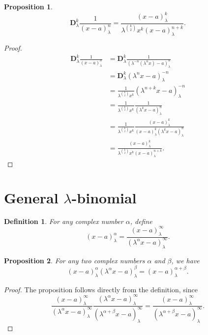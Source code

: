 \documentclass[12pt]{article}
\newcommand{\D}{\mathbf{D}}
\newtheorem{definition}{Definition}
\newtheorem{proposition}{Proposition}
\begin{document}
\begin{proposition}
    \begin{equation}
        \D_{\lambda}^k\frac{1}{(x-a)_{\lambda}^n}=\frac{(x-a)_{\lambda}^k}{\lambda^{\binom{k}{2}}x^k(x-a)_{\lambda}^{n+k}}.
    \end{equation}
\end{proposition}
\begin{proof}
    \begin{align*}
        \D_{\lambda}^k\frac{1}{(x-a)_{\lambda}^n}&=\D_{\lambda}^k\frac{1}{(\lambda^{-n}(\lambda^nx)-a)_{\lambda}^n}\\
        &=\D_{\lambda}^{k}(\lambda^nx-a)_{\lambda}^{-n}\\
        &=\frac{1}{\lambda^{\binom{k}{2}}x^k}(\lambda^{n+k}x-a)_{\lambda}^{-n}\\
        &=\frac{1}{\lambda^{\binom{k}{2}}x^k}\frac{1}{(\lambda^{k}x-a)_{\lambda}^n}\\
        &=\frac{1}{\lambda^{\binom{k}{2}}x^k}\frac{(x-a)_{\lambda}^k}{(x-a)_{\lambda}^k(\lambda^{k}x-a)_{\lambda}^n}\\
        &=\frac{(x-a)_{\lambda}^k}{\lambda^{\binom{k}{2}}x^k(x-a)_{\lambda}^{n+k}}.
    \end{align*}
\end{proof}

\section{General $\lambda$-binomial}\label{sec6}

\begin{definition}
For any complex number $\alpha$, define     
\begin{equation}
    (x-a)_{\lambda}^\alpha=\frac{(x-a)_{\lambda}^{\infty}}{(\lambda^{\alpha}x-a)_{\lambda}^\infty}.
\end{equation}
\end{definition}

\begin{proposition}
For any two complex numbers $\alpha$ and $\beta$, we have
    \begin{equation}
        (x-a)_{\lambda}^{\alpha}(\lambda^{\alpha}x-a)_{\lambda}^{\beta}=(x-a)_{\lambda}^{\alpha+\beta}.
    \end{equation}
\end{proposition}
\begin{proof}
The proposition follows directly from the definition, since
    \begin{equation*}
        \frac{(x-a)_{\lambda}^{\infty}}{(\lambda^{\alpha}x-a)_{\lambda}^\infty}\frac{(\lambda^\alpha x-a)_{\lambda}^{\infty}}{(\lambda^{\alpha+\beta}x-a)_{\lambda}^\infty}=\frac{(x-a)_{\lambda}^{\infty}}{(\lambda^{\alpha+\beta}x-a)_{\lambda}^\infty}.
    \end{equation*}
\end{proof}
\end{document}
